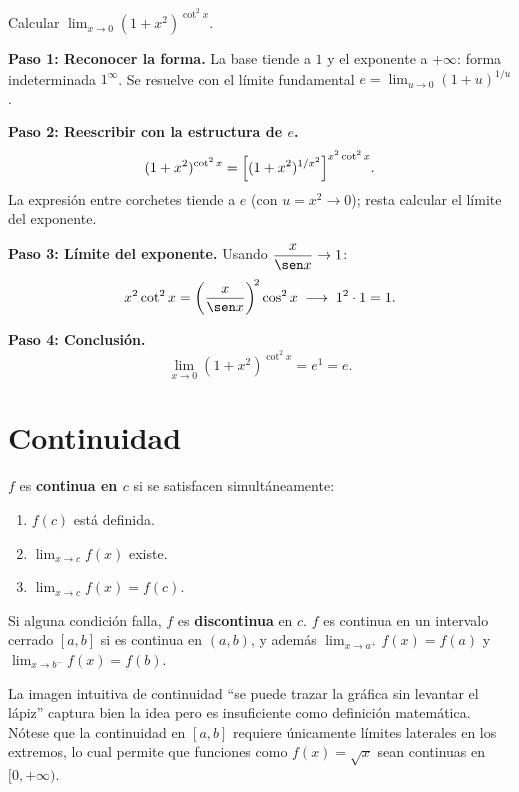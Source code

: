 \begin{example}
Calcular $\displaystyle\lim_{x\to 0}(1+x^2)^{\cot^2 x}$.

\begin{myproof}
\textbf{Paso 1: Reconocer la forma.} La base tiende a $1$ y el exponente a
$+\infty$: forma indeterminada $1^\infty$. Se resuelve con el límite
fundamental $e = \lim_{u\to 0}(1+u)^{1/u}$.

\textbf{Paso 2: Reescribir con la estructura de $e$.}
\[
  (1+x^2)^{\cot^2 x}
  = \Bigl[(1+x^2)^{1/x^2}\Bigr]^{x^2\cot^2 x}.
\]
La expresión entre corchetes tiende a $e$ (con $u=x^2\to 0$); resta
calcular el límite del exponente.

\textbf{Paso 3: Límite del exponente.} Usando $\dfrac{x}{\sen x}\to 1$:
\[
  x^2\cot^2 x = \left(\frac{x}{\sen x}\right)^{\!2}\cos^2 x
  \;\longrightarrow\; 1^2\cdot 1 = 1.
\]

\textbf{Paso 4: Conclusión.}
\[
  \boxed{\lim_{x\to 0}(1+x^2)^{\cot^2 x} = e^{1} = e.}
\]
\end{myproof}
\end{example}

\section{Continuidad}

\begin{definition}
$f$ es \textbf{continua en $c$} si se satisfacen simultáneamente:
\begin{enumerate}
  \item $f(c)$ está definida.
  \item $\lim_{x\to c}f(x)$ existe.
  \item $\lim_{x\to c}f(x) = f(c)$.
\end{enumerate}
Si alguna condición falla, $f$ es \textbf{discontinua} en $c$. $f$ es
continua en un intervalo cerrado $[a,b]$ si es continua en $(a,b)$, y además
$\lim_{x\to a^+}f(x)=f(a)$ y $\lim_{x\to b^-}f(x)=f(b)$.
\end{definition}

La imagen intuitiva de continuidad ``se puede trazar la gráfica sin
levantar el lápiz'' captura bien la idea pero es insuficiente como
definición matemática. Nótese que la continuidad en $[a,b]$ requiere
únicamente límites laterales en los extremos, lo cual permite que funciones
como $f(x)=\sqrt{x}$ sean continuas en $[0,+\infty)$.

